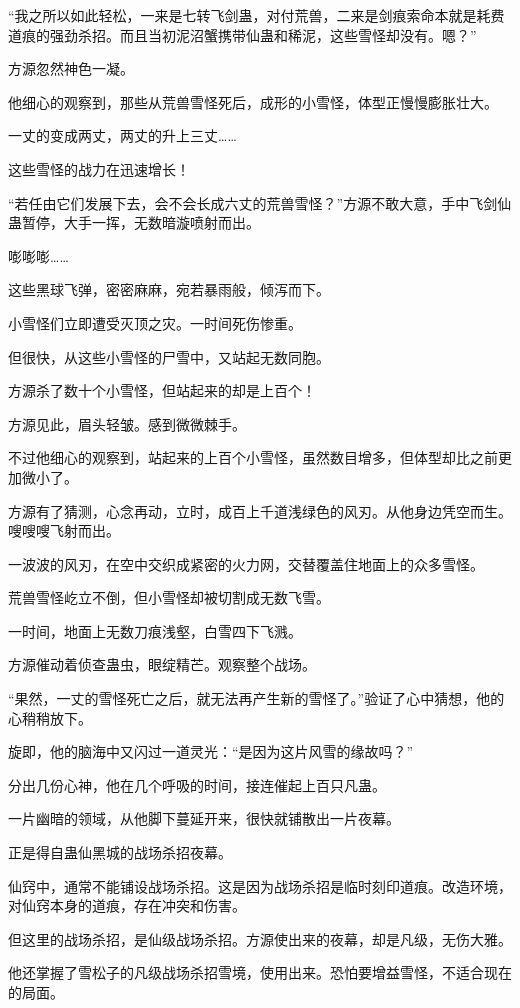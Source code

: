 \begin{this_body}
“我之所以如此轻松，一来是七转飞剑蛊，对付荒兽，二来是剑痕索命本就是耗费道痕的强劲杀招。而且当初泥沼蟹携带仙蛊和稀泥，这些雪怪却没有。嗯？”

方源忽然神色一凝。

他细心的观察到，那些从荒兽雪怪死后，成形的小雪怪，体型正慢慢膨胀壮大。

一丈的变成两丈，两丈的升上三丈……

这些雪怪的战力在迅速增长！

“若任由它们发展下去，会不会长成六丈的荒兽雪怪？”方源不敢大意，手中飞剑仙蛊暂停，大手一挥，无数暗漩喷射而出。

嘭嘭嘭……

这些黑球飞弹，密密麻麻，宛若暴雨般，倾泻而下。

小雪怪们立即遭受灭顶之灾。一时间死伤惨重。

但很快，从这些小雪怪的尸雪中，又站起无数同胞。

方源杀了数十个小雪怪，但站起来的却是上百个！

方源见此，眉头轻皱。感到微微棘手。

不过他细心的观察到，站起来的上百个小雪怪，虽然数目增多，但体型却比之前更加微小了。

方源有了猜测，心念再动，立时，成百上千道浅绿色的风刃。从他身边凭空而生。嗖嗖嗖飞射而出。

一波波的风刃，在空中交织成紧密的火力网，交替覆盖住地面上的众多雪怪。

荒兽雪怪屹立不倒，但小雪怪却被切割成无数飞雪。

一时间，地面上无数刀痕浅壑，白雪四下飞溅。

方源催动着侦查蛊虫，眼绽精芒。观察整个战场。

“果然，一丈的雪怪死亡之后，就无法再产生新的雪怪了。”验证了心中猜想，他的心稍稍放下。

旋即，他的脑海中又闪过一道灵光：“是因为这片风雪的缘故吗？”

分出几份心神，他在几个呼吸的时间，接连催起上百只凡蛊。

一片幽暗的领域，从他脚下蔓延开来，很快就铺散出一片夜幕。

正是得自蛊仙黑城的战场杀招夜幕。

仙窍中，通常不能铺设战场杀招。这是因为战场杀招是临时刻印道痕。改造环境，对仙窍本身的道痕，存在冲突和伤害。

但这里的战场杀招，是仙级战场杀招。方源使出来的夜幕，却是凡级，无伤大雅。

他还掌握了雪松子的凡级战场杀招雪境，使用出来。恐怕要增益雪怪，不适合现在的局面。


\end{this_body}
